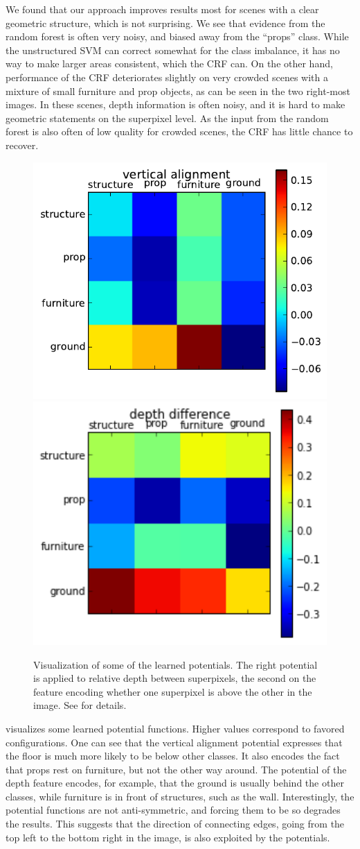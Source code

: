\documentclass[a4paper, 10pt, conference]{ieeeconf}      %
\begin{document}
We found that our approach improves results most for scenes with a clear geometric structure,
which is not surprising. We see that evidence from the random forest is often very noisy, and biased
away from the ``props'' class. While the unstructured SVM can correct somewhat
for the class imbalance, it has no way to make larger areas consistent, which
the CRF can.
On the other hand, performance of the CRF deteriorates slightly on very crowded
scenes with a mixture of small furniture and prop objects, as
can be seen in the two right-most images. In these scenes, depth information is
often noisy, and it is hard to make geometric statements on the superpixel
level. As the input from the random forest is also often of low quality for
crowded scenes, the CRF has little chance to recover.

\begin{figure}
    \begin{center}
        \includegraphics[width=.45\linewidth]{images/vertical_alignment}\vspace{1mm}
    \includegraphics[width=.45\linewidth]{images/depth_difference}
    \end{center}
    \caption{%
        Visualization of some of the learned potentials. The right potential is
        applied to relative depth between superpixels, the second on the
        feature encoding whether one superpixel is above the other in the
        image. See  for details.
    }
\end{figure}

 visualizes some learned potential functions.
Higher values correspond to favored configurations. One can see that the
vertical alignment potential expresses that the floor is much more likely to be below
other classes. It also encodes the fact that props
rest on furniture, but not the other way around.
The potential of the depth feature encodes, for example, that the ground
is usually behind the other classes, while furniture is in front of structures,
such as the wall.
Interestingly, the potential functions are not anti-symmetric, and forcing them to be so
degrades the results. This suggests that the direction of connecting edges, going from
the top left to the bottom right in the image, is also exploited by the potentials.
\end{document}
